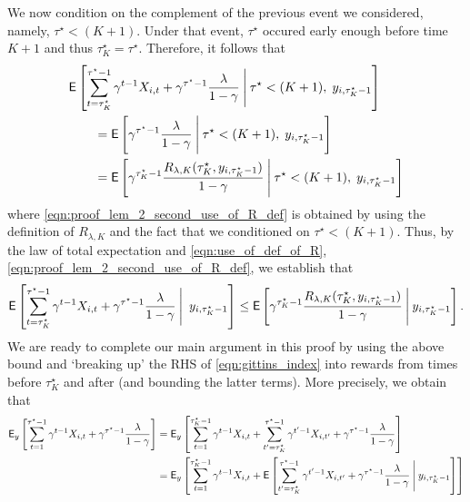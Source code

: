 \begin{myproof}[Proof.]
	We now condition on the complement of the previous event we considered, namely, $\tau^\star < (K+1)$. Under that event, $\tau^\star$ occured early enough before time $K+1$ and thus $\tau^\star_K = \tau^\star$. Therefore, it follows that
	\begin{align} 
	&\E\left[\sum_{t=\tau_K^\star}^{\tau^\star-1}\gamma^{t-1} X_{i,t} + \gamma^{\tau^\star-1} \frac{\lambda}{1-\gamma}
	\given[\Bigg] \tau^\star < (K+1), \;y_{i,\tau^\star_K-1} \right] \nonumber  \\
	&\qquad = \E\left[\gamma^{\tau^\star-1}  \frac{\lambda}{1-\gamma}
	\given[\Bigg]\tau^\star < (K+1), \; y_{i,\tau^\star_K-1} \right] \nonumber \\
	&\qquad = \E\left[\gamma^{\tau^\star_K-1}  \frac{R_{\lambda,K}(\tau^\star_K, y_{i,\tau^\star_K-1})}{1-\gamma}
	\given[\Bigg]\tau^\star < (K+1), \; y_{i,\tau^\star_K-1} \right] \label{eqn:proof_lem_2_second_use_of_R_def}
	\end{align}
	where \eqref{eqn:proof_lem_2_second_use_of_R_def} is obtained by using the definition of $R_{\lambda,K}$ and the fact that we conditioned on $\tau^\star < (K+1)$. Thus, by the law of total expectation and \eqref{eqn:use_of_def_of_R}, \eqref{eqn:proof_lem_2_second_use_of_R_def}, we establish that
	\begin{equation} \label{ineq:proof_lem_2_main_bound_in_proof}
	\E\left[\sum_{t=\tau_K^\star}^{\tau^\star-1}\gamma^{t-1} X_{i,t} + \gamma^{\tau^\star-1} \frac{\lambda}{1-\gamma}
	\given[\Bigg] \;y_{i,\tau^\star_K-1} \right] \le \Ee{\gamma^{\tau^\star_K-1}  \frac{R_{\lambda,K}(\tau^\star_K, y_{i,\tau^\star_K-1})}{1-\gamma} \given[\Bigg] y_{i,\tau^\star_K-1}}.
	\end{equation}
	We are ready to complete our main argument in this proof by using the above bound and `breaking up' the RHS of \eqref{eqn:gittins_index} into rewards from times before $\tau_K^\star$ and after (and bounding the latter terms). More precisely, we obtain that
	\begin{align}
	\E_{y}\left[\sum_{t=1}^{\tau^\star-1}\gamma^{t-1} X_{i,t} + \gamma^{\tau^\star-1}\frac{\lambda}{1-\gamma}\right] & = \E_{y}\left[\sum_{t=1}^{\tau^\star_K-1}\gamma^{t-1} X_{i,t} + \sum_{t'=\tau^\star_K}^{\tau^\star-1}\gamma^{t'-1} X_{i,t'} +  \gamma^{\tau^\star-1}\frac{\lambda}{1-\gamma}\right] \nonumber \\
	& = \E_{y}\left[\sum_{t=1}^{\tau^\star_K-1}\gamma^{t-1} X_{i,t} + \Ee{\sum_{t'=\tau^\star_K}^{\tau^\star-1}\gamma^{t'-1} X_{i,t'} +  \gamma^{\tau^\star-1}\frac{\lambda}{1-\gamma} \given[\Bigg] y_{i,\tau^\star_K-1} }\right] \label{eqn:proof_lem_2_tower_prop_again} \\

\end{align}
\end{myproof}
